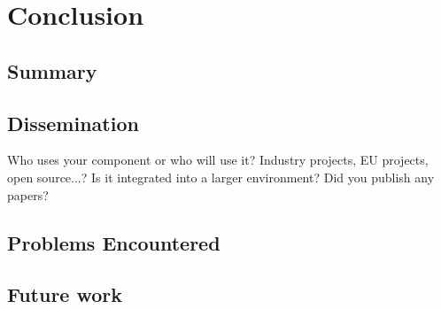 
\chapter{Conclusion} %



\section{Summary}
\section{Dissemination}
Who uses your component or who will use it? Industry projects, EU projects, open 
source...? Is it integrated into a larger environment? Did you publish any papers? 
\section{Problems Encountered}
\section{Future work}




